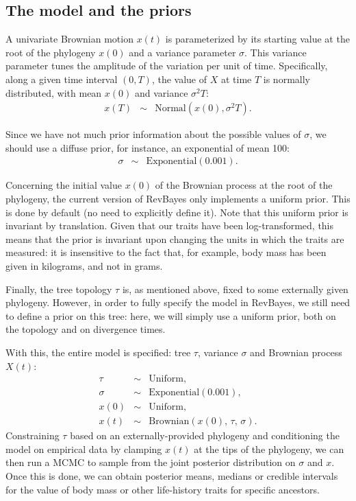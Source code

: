 \documentclass[usletter]{article}
\begin{document}
\subsection*{The model and the priors}

A univariate Brownian motion $x(t)$ is parameterized by its starting value at the root of the phylogeny $x(0)$ and a variance parameter $\sigma$. This variance parameter tunes the amplitude of the variation per unit of time. Specifically, along a given time interval $(0,T)$, the value of $X$ at time $T$ is normally distributed, with mean $x(0)$ and variance $\sigma^2 T$:
\begin{eqnarray*}
x(T) &\sim& \text{Normal} \left( x(0), \sigma^2 T \right).
\end{eqnarray*}

Since we have not much prior information about the possible values of $\sigma$, we should use a diffuse prior, for instance, an exponential of mean 100:
\begin{eqnarray*}
\sigma &\sim& \text{Exponential}(0.001).
\end{eqnarray*}

Concerning the initial value $x(0)$ of the Brownian process at the root of the phylogeny,
the current version of RevBayes only implements a uniform prior.
This is done by default (no need to explicitly define it).
Note that this uniform prior is invariant by translation. Given that our traits have been log-transformed, this means that the prior is invariant upon changing the units in which the traits are measured: it is insensitive to the fact that, for example, body mass has been given in kilograms, and not in grams.

Finally, the tree topology $\tau$ is, as mentioned above, fixed to some externally given phylogeny. However, in order to fully specify the model in RevBayes, we still need to define a prior on this tree: here, we will simply use a uniform prior, both on the topology and on divergence times.

With this, the entire model is specified: tree $\tau$, variance $\sigma$ and Brownian process $X(t)$:
\begin{eqnarray*}
\tau &\sim& \text{Uniform},
\\
\sigma &\sim& \text{Exponential}(0.001),
\\
x(0) &\sim& \text{Uniform},
\\
x(t) &\sim& \text{Brownian} \left( x(0), \, \tau, \, \sigma \right).
\end{eqnarray*}
Constraining $\tau$ based on an externally-provided phylogeny and conditioning the model on empirical data by clamping $x(t)$ at the tips of the phylogeny, we can then run a MCMC to sample from the joint posterior distribution on $\sigma$ and $x$. Once this is done, we can obtain posterior means, medians or credible intervals for the value of body mass or other life-history traits for specific ancestors.
\end{document}
